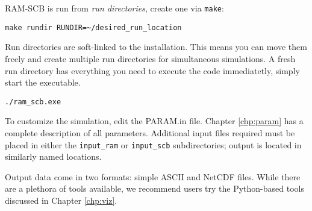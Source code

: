 RAM-SCB is run from \textit{run directories}, create one via {\tt make}:

\begin{verbatim}
make rundir RUNDIR=~/desired_run_location
\end{verbatim}

Run directories are soft-linked to the installation.  This means you can move
them freely and create multiple run directories for simultaneous simulations.
A fresh run directory has everything you need to execute the code immediatetly,
simply start the executable.

\begin{verbatim}
./ram_scb.exe
\end{verbatim}

To customize the simulation, edit the PARAM.in file.  Chapter \ref{chp:param}
has a complete description of all parameters.  Additional input files 
required must be placed in either the {\tt input\_ram} or {\tt input\_scb}
subdirectories; output is located in similarly named locations.

Output data come in two formats: simple ASCII and NetCDF files.  While there
are a plethora of tools available, we recommend users try the Python-based
tools discussed in Chapter \ref{chp:viz}.
